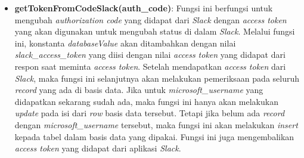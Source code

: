 \begin{itemize}
\begin{itemize}
        \item \textbf{getTokenFromCodeSlack(auth\_code)}: Fungsi ini berfungsi untuk mengubah \textit{authorization code} yang didapat dari \textit{Slack} dengan \textit{access token} yang akan digunakan untuk mengubah status di dalam \textit{Slack}. Melalui fungsi ini, konstanta \textit{databaseValue} akan ditambahkan dengan nilai \textit{slack\_access\_token} yang diisi dengan nilai \textit{access token} yang didapat dari respon saat meminta \textit{access token}. Setelah mendapatkan \textit{access token} dari \textit{Slack}, maka fungsi ini selanjutnya akan melakukan pemeriksaan pada seluruh \textit{record} yang ada di basis data. Jika untuk \textit{microsoft\_username} yang didapatkan sekarang sudah ada, maka fungsi ini hanya akan melakukan \textit{update} pada isi dari \textit{row} basis data tersebut. Tetapi jika belum ada \textit{record} dengan \textit{microsoft\_username} tersebut, maka fungsi ini akan melakukan \textit{insert} kepada tabel dalam basis data yang dipakai. Fungsi ini juga mengembalikan \textit{access token} yang didapat dari aplikasi \textit{Slack}. 
    \end{itemize}
\end{itemize}


